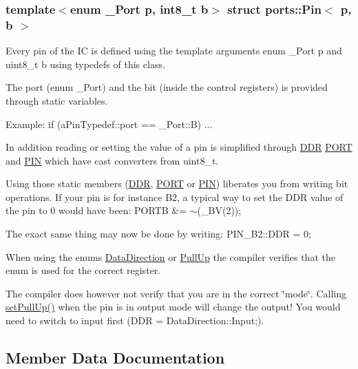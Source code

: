 \subsubsection*{template$<$enum \+\_\+\+Port p, int8\+\_\+t b$>$\newline
struct ports\+::\+Pin$<$ p, b $>$}

Every pin of the IC is defined using the template arguments {\ttfamily enum \+\_\+\+Port p} and {\ttfamily uint8\+\_\+t b} using {\ttfamily typedef}s of this class. 

The port (enum \+\_\+\+Port) and the bit (inside the control registers) is provided through static variables.

Example\+: {\ttfamily if (a\+Pin\+Typedef\+::port == \+\_\+\+Port\+::B) ...}

In addition reading or setting the value of a pin is simplified through \hyperlink{structports_1_1Pin_aaebb4d6cb5db0635fe8e7d6e7d315c7f}{D\+DR} \hyperlink{structports_1_1Pin_aaa08f0eb17ef31d9f46d65d50c8a093e}{P\+O\+RT} and \hyperlink{structports_1_1Pin_ae2e45a41082457c350f71f7a720265d4}{P\+IN} which have cast converters from uint8\+\_\+t.

Using those static members (\hyperlink{structports_1_1Pin_aaebb4d6cb5db0635fe8e7d6e7d315c7f}{D\+DR}, \hyperlink{structports_1_1Pin_aaa08f0eb17ef31d9f46d65d50c8a093e}{P\+O\+RT} or \hyperlink{structports_1_1Pin_ae2e45a41082457c350f71f7a720265d4}{P\+IN}) liberates you from writing bit operations. If your pin is for instance B2, a typical way to set the D\+DR value of the pin to 0 would have been\+: {\ttfamily P\+O\+R\+TB \&= $\sim$(\+\_\+\+B\+V(2));}

The exact same thing may now be done by writing\+: {\ttfamily P\+I\+N\+\_\+\+B2\+::\+D\+DR = 0;}

When using the enums \hyperlink{namespaceports_a46987e78fa447129742fadda5eccafb4}{Data\+Direction} or \hyperlink{namespaceports_a49bf0ccedb4cfed89a328574e53bec07}{Pull\+Up} the compiler verifies that the enum is used for the correct register.

The compiler does however not verify that you are in the correct \char`\"{}mode\char`\"{}. Calling \hyperlink{structports_1_1Pin_a11ba9e7aeda2d867780dee32234f2c7e}{set\+Pull\+Up()} when the pin is in output mode will change the output! You would need to switch to input first ({\ttfamily D\+DR = Data\+Direction\+::\+Input;}). 

\subsection{Member Data Documentation}
\hypertarget{structports_1_1Pin_afd4a15583df02e1b3ba504c3e709a514}{}\label{structports_1_1Pin_afd4a15583df02e1b3ba504c3e709a514} 
